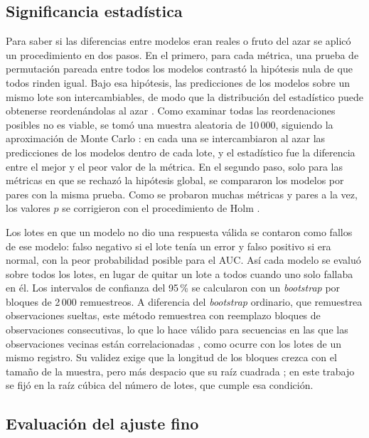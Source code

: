 \subsection{Significancia estadística}\label{subsec:met_significancia}

Para saber si las diferencias entre modelos eran reales o fruto del azar se aplicó un procedimiento en dos pasos. En el primero, para cada métrica, una prueba de permutación pareada entre todos los modelos contrastó la hipótesis nula de que todos rinden igual. Bajo esa hipótesis, las predicciones de los modelos sobre un mismo lote son intercambiables, de modo que la distribución del estadístico puede obtenerse reordenándolas al azar \cite{good2005_permutation}. Como examinar todas las reordenaciones posibles no es viable, se tomó una muestra aleatoria de 10\,000, siguiendo la aproximación de Monte Carlo \cite{good2005_permutation}: en cada una se intercambiaron al azar las predicciones de los modelos dentro de cada lote, y el estadístico fue la diferencia entre el mejor y el peor valor de la métrica. En el segundo paso, solo para las métricas en que se rechazó la hipótesis global, se compararon los modelos por pares con la misma prueba. Como se probaron muchas métricas y pares a la vez, los valores $p$ se corrigieron con el procedimiento de Holm \cite{holm1979_sequential}.

Los lotes en que un modelo no dio una respuesta válida se contaron como fallos de ese modelo: falso negativo si el lote tenía un error y falso positivo si era normal, con la peor probabilidad posible para el AUC. Así cada modelo se evaluó sobre todos los lotes, en lugar de quitar un lote a todos cuando uno solo fallaba en él. Los intervalos de confianza del 95\,\% se calcularon con un \textit{bootstrap} por bloques de 2\,000 remuestreos. A diferencia del \textit{bootstrap} ordinario, que remuestrea observaciones sueltas, este método remuestrea con reemplazo bloques de observaciones consecutivas, lo que lo hace válido para secuencias en las que las observaciones vecinas están correlacionadas \cite{buhlmann1994_blockwise}, como ocurre con los lotes de un mismo registro. Su validez exige que la longitud de los bloques crezca con el tamaño de la muestra, pero más despacio que su raíz cuadrada \cite{buhlmann1994_blockwise}; en este trabajo se fijó en la raíz cúbica del número de lotes, que cumple esa condición.

\subsection{Evaluación del ajuste fino}


